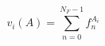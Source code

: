 \begin{equation}
v_i(A) = \sum_{n=0}^{N_F-1} f_n^{A_i}
\label{eq:feature_block_sorting_value}
\end{equation}
